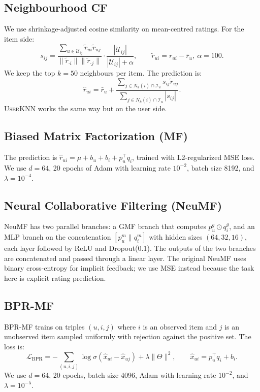 \documentclass[sigconf,nonacm]{acmart}
\begin{document}
\subsection{Neighbourhood CF}
We use shrinkage-adjusted cosine similarity on mean-centred ratings. For
the item side:
\begin{equation}
s_{ij} = \frac{\sum_{u \in \mathcal{U}_{ij}} \tilde{r}_{ui} \tilde{r}_{uj}}{\|\tilde{r}_{\cdot i}\| \|\tilde{r}_{\cdot j}\|} \cdot \frac{|\mathcal{U}_{ij}|}{|\mathcal{U}_{ij}| + \alpha}, \qquad \tilde{r}_{ui} = r_{ui} - \bar{r}_u,\ \alpha = 100.
\end{equation}
We keep the top $k = 50$ neighbours per item. The prediction is:
\begin{equation}
\hat{r}_{ui} = \bar{r}_u + \frac{\sum_{j \in N_k(i) \cap \mathcal{I}_u} s_{ij} \tilde{r}_{uj}}{\sum_{j \in N_k(i) \cap \mathcal{I}_u} |s_{ij}|}.
\end{equation}
\textsc{UserKNN} works the same way but on the user side.

\subsection{Biased Matrix Factorization (MF)}
The prediction is $\hat{r}_{ui} = \mu + b_u + b_i + p_u^\top q_i$, trained
with L2-regularized MSE loss. We use $d = 64$, 20 epochs of Adam with
learning rate $10^{-2}$, batch size 8192, and $\lambda = 10^{-4}$.

\subsection{Neural Collaborative Filtering (NeuMF)}
NeuMF has two parallel branches: a GMF branch that computes
$p_u^g \odot q_i^g$, and an MLP branch on the concatenation
$[p_u^m \| q_i^m]$ with hidden sizes $(64, 32, 16)$, each layer followed by
ReLU and Dropout(0.1). The outputs of the two branches are concatenated
and passed through a linear layer. The original NeuMF uses binary
cross-entropy for implicit feedback; we use MSE instead because the task
here is explicit rating prediction.

\subsection{BPR-MF}
BPR-MF trains on triples $(u, i, j)$ where $i$ is an observed item and
$j$ is an unobserved item sampled uniformly with rejection against the
positive set. The loss is:
\begin{equation}
\mathcal{L}_{\text{BPR}} = -\sum_{(u,i,j)} \log \sigma(\hat{x}_{ui} - \hat{x}_{uj}) + \lambda \|\Theta\|^2, \qquad \hat{x}_{ui} = p_u^\top q_i + b_i.
\end{equation}
We use $d = 64$, 20 epochs, batch size 4096, Adam with learning rate
$10^{-2}$, and $\lambda = 10^{-5}$.
\end{document}
